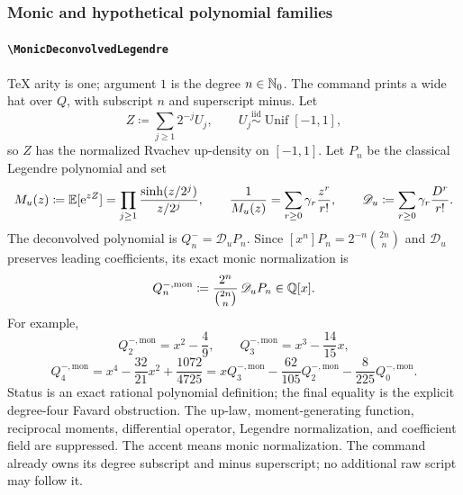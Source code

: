 \documentclass[11pt,oneside]{article}
\theoremstyle{definition}
\theoremstyle{remark}
\DeclareRobustCommand{\commandname}[1]{\texttt{\textbackslash#1}}
\DeclareRobustCommand{\localaccentname}[1]{\commandname{#1}}
\begin{document}
\subsubsection{Monic and hypothetical polynomial families}

\paragraph{\localaccentname{MonicDeconvolvedLegendre}}
TeX arity is one; argument \(1\) is the degree
\(n\in\mathbb{N}_{0}\).  The command prints a wide hat over \(Q\), with
 subscript \(n\) and superscript minus.  Let
\[
 Z\coloneqq\sum_{j\ge1}2^{-j}U_j,
 \qquad U_j\stackrel{\mathrm{iid}}{\sim}\operatorname{Unif}[-1,1],
\]
so \(Z\) has the normalized Rvachev up-density on \([-1,1]\).  Let \(P_n\)
be the classical Legendre polynomial and set
\[
 M_u(z)
 \mathrel{\coloneqq}
 \mathbb{E}[\mathrm{e}^{zZ}]
 =
 \prod_{j\ge1}
 \frac{\sinh(z/2^j)}{z/2^j},
 \qquad
 \frac1{M_u(z)}
 =
 \sum_{r\ge0}\gamma_r\frac{z^r}{r!},
 \qquad
 \mathscr D_u
 \mathrel{\coloneqq}
 \sum_{r\ge0}\gamma_r\frac{D^r}{r!}.
\]
The deconvolved polynomial is \(Q_n^-=\mathscr D_uP_n\).  Since
\([x^n]P_n=2^{-n}\binom{2n}{n}\) and \(\mathscr D_u\) preserves leading
coefficients, its exact monic normalization is
\[
 Q_n^{-,\mathrm{mon}}
 \mathrel{\coloneqq}
 \frac{2^n}{\binom{2n}{n}}\,
 \mathscr D_uP_n
 \in\mathbb{Q}[x].
\]
For example,
\[
 Q_2^{-,\mathrm{mon}}=x^2-\frac49,\qquad
 Q_3^{-,\mathrm{mon}}=x^3-\frac{14}{15}x,
\]
\[
 Q_4^{-,\mathrm{mon}}
 =x^4-\frac{32}{21}x^2+\frac{1072}{4725}
 =xQ_3^{-,\mathrm{mon}}
  -\frac{62}{105}Q_2^{-,\mathrm{mon}}
  -\frac8{225}Q_0^{-,\mathrm{mon}}.
\]
Status is an exact rational polynomial definition; the final equality is the
explicit degree-four Favard obstruction.  The up-law, moment-generating
function, reciprocal moments, differential operator, Legendre normalization,
and coefficient field are suppressed.  The accent means monic normalization.
The command already owns its degree subscript and minus superscript; no
additional raw script may follow it.
\end{document}
